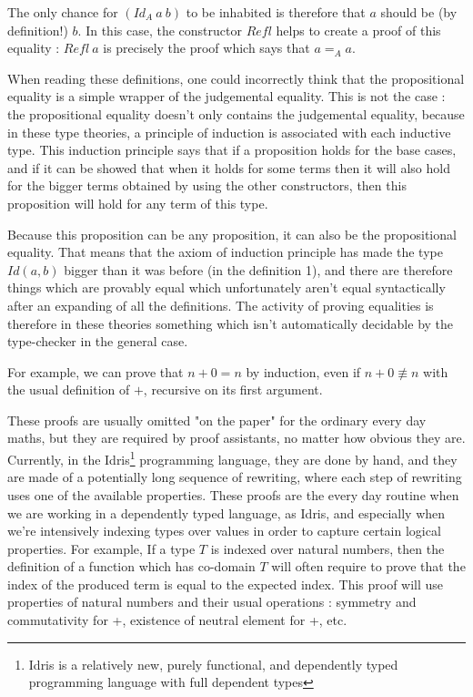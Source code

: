 The only chance for $(Id_A\ a\ b)$ to be inhabited is therefore that $a$ should be (by definition!) $b$. In this case, the constructor $Refl$ helps to create a proof of this equality : $Refl\ a$ is precisely the proof which says that $a=_Aa$. 

When reading these definitions, one could incorrectly think that the propositional equality is a simple wrapper of the judgemental equality. This is not the case : the propositional equality doesn't only contains the judgemental equality, because in these type theories, a principle of induction is associated with each inductive type. This induction principle says that if a proposition holds for the base cases, and if it can be showed that when it holds for some terms then it will also hold for the bigger terms obtained by using the other constructors, then this proposition will hold for any term of this type.

Because this proposition can be any proposition, it can also be the propositional equality. That means that the axiom of induction principle has made the type $Id(a,b)$ bigger than it was before (in the definition 1), and there are therefore things which are provably equal which unfortunately aren't equal syntactically after an expanding of all the definitions. The activity of proving equalities is therefore in these theories something which isn't automatically decidable by the type-checker in the general case.

For example, we can prove that $n+0 = n$ by induction, even if $n+0 \not\equiv n$ with the usual definition of $+$, recursive on its first argument. 

These proofs are usually omitted "on the paper" for the ordinary every day maths, but they are required by proof assistants, no matter how obvious they are. Currently, in the Idris\footnote{Idris is a relatively new, purely functional, and dependently typed programming language with full dependent types} programming language, they are done by hand, and they are made of a potentially long sequence of rewriting, where each step of rewriting uses one of the available properties. 
These proofs are the every day routine when we are working in a dependently typed language, as Idris, and especially when we're intensively indexing types over values in order to capture certain logical properties.
For example, If a type $T$ is indexed over natural numbers, then the definition of a function which has co-domain $T$ will often require to prove that the index of the produced term is equal to the expected index. This proof will use properties of natural numbers and their usual operations : symmetry and commutativity for +, existence of neutral element for +, etc.

